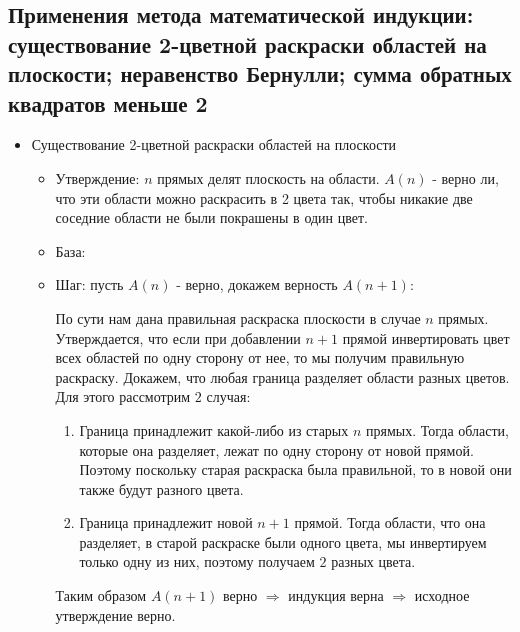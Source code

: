 \subsection{Применения метода математической индукции: существование 2-цветной раскраски областей на плоскости; неравенство Бернулли; сумма обратных квадратов меньше 2}
	\begin{itemize}
		\item Существование 2-цветной раскраски областей на плоскости
		\begin{itemize}
			\item Утверждение: $n$ прямых делят плоскость на области. $A(n)$ - верно ли, что эти области можно раскрасить в 2 цвета так, чтобы никакие две соседние области не были покрашены в один цвет.
			\item База:
			\item Шаг: пусть $A(n)$ - верно, докажем верность $A(n + 1)$:
			
			По сути нам дана правильная раскраска плоскости в случае $n$ прямых. Утверждается, что если при добавлении $n+1$ прямой инвертировать цвет всех областей по одну сторону от нее, то мы получим правильную раскраску. Докажем, что любая граница разделяет области разных цветов. Для этого рассмотрим $2$ случая:
			\begin{enumerate}
				\item Граница принадлежит какой-либо из старых $n$ прямых. Тогда области, которые она разделяет, лежат по одну сторону от новой прямой. Поэтому поскольку старая раскраска была правильной, то в новой они также будут разного цвета.
				\item Граница принадлежит новой $n+1$ прямой. Тогда области, что она разделяет, в старой раскраске были одного цвета, мы инвертируем только одну из них, поэтому получаем $2$ разных цвета.
			\end{enumerate}
			
			Таким образом $A(n + 1)$ верно $\Rightarrow$ индукция верна $\Rightarrow$ исходное утверждение верно.
		\end{itemize}
		

\end{itemize}

